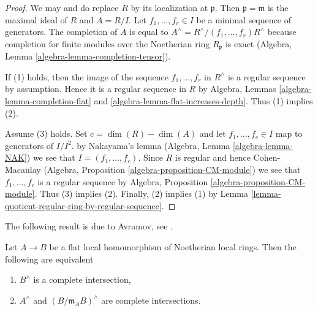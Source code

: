 \begin{proof}
We may and do replace $R$ by its localization at $\mathfrak p$.
Then $\mathfrak p = \mathfrak m$ is the maximal ideal of $R$
and $A = R/I$. Let $f_1, \ldots, f_r \in I$ be a minimal sequence
of generators.  The completion of $A$ is equal to
$A^\wedge = R^\wedge/(f_1, \ldots, f_r)R^\wedge$
because completion for finite modules over the Noetherian ring
$R_\mathfrak p$ is exact
(Algebra, Lemma \ref{algebra-lemma-completion-tensor}).

\medskip\noindent
If (1) holds, then the image of the sequence $f_1, \ldots, f_r$ in $R^\wedge$
is a regular sequence by assumption. Hence it is a regular sequence
in $R$ by Algebra, Lemmas \ref{algebra-lemma-completion-flat} and
\ref{algebra-lemma-flat-increases-depth}. Thus (1) implies (2).

\medskip\noindent
Assume (3) holds. Set $c = \dim(R) - \dim(A)$ and let $f_1, \ldots, f_c \in I$
map to generators of $I/I^2$. by Nakayama's lemma
(Algebra, Lemma \ref{algebra-lemma-NAK})
we see that $I = (f_1, \ldots, f_c)$. Since $R$ is regular and hence
Cohen-Macaulay (Algebra, Proposition \ref{algebra-proposition-CM-module})
we see that $f_1, \ldots, f_c$ is a regular sequence by
Algebra, Proposition \ref{algebra-proposition-CM-module}.
Thus (3) implies (2).
Finally, (2) implies (1) by
Lemma \ref{lemma-quotient-regular-ring-by-regular-sequence}.
\end{proof}

\noindent
The following result is due to Avramov, see \cite{Avramov}.

\begin{proposition}
\label{proposition-avramov}
Let $A \to B$ be a flat local homomorphism of Noetherian local rings.
Then the following are equivalent
\begin{enumerate}
\item $B^\wedge$ is a complete intersection,
\item $A^\wedge$ and $(B/\mathfrak m_A B)^\wedge$ are complete intersections.
\end{enumerate}
\end{proposition}

